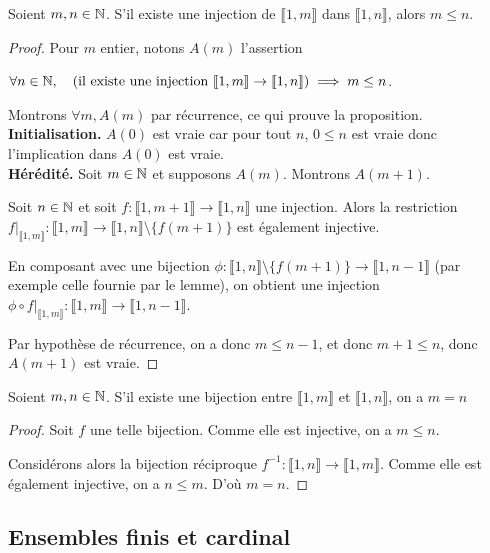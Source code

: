 \begin{lemme}
Soient $m,n\in \mathbb{N}$.
S'il existe une injection de $\llbracket 1,m\rrbracket$ dans $\llbracket 1,n\rrbracket$, alors $m\leq n$.
\end{lemme}
\begin{proof}
Pour $m$ entier, notons $A(m)$ l'assertion 
\begin{center}
$\forall n\in \mathbb{N}, \quad  (\text{il existe une injection } \llbracket 1,m\rrbracket \to \llbracket 1,n\rrbracket) \implies m\leq n$.
\end{center}
Montrons $\forall m, A(m)$ par récurrence, ce qui prouve la proposition.\\
\textbf{Initialisation.} $A(0)$ est vraie car pour tout $n$, $0\leq n$ est vraie donc l'implication dans $A(0)$ est vraie.\\
\textbf{Hérédité.} Soit $m\in\mathbb{N}$ et supposons $A(m)$. Montrons $A(m+1)$.

Soit $n\in \mathbb{N}$ et soit $f : \llbracket 1,m+1\rrbracket \to \llbracket 1,n\rrbracket$ une injection. Alors la restriction $f|_{\llbracket 1,m\rrbracket} : \llbracket 1,m\rrbracket \to \llbracket 1,n\rrbracket\setminus \{f(m+1)\}$ est également injective.

En composant avec une bijection $\phi : \llbracket 1,n\rrbracket\setminus \{f(m+1)\} \to \llbracket 1,n-1\rrbracket$ (par exemple celle fournie par le lemme), on obtient une injection $\phi\circ f|_{\llbracket 1,m\rrbracket} : \llbracket 1,m\rrbracket \to \llbracket 1,n-1\rrbracket$.

Par hypothèse de récurrence, on a donc $m\leq n-1$, et donc $m+1\leq n$, donc $A(m+1)$ est vraie.
\end{proof}

\begin{lemme}
Soient $m, n\in \mathbb{N}$. S'il existe une bijection entre $\llbracket 1,m\rrbracket$ et $\llbracket 1,n\rrbracket$, on a  $m=n$
\end{lemme}
\begin{proof}
Soit $f$ une telle bijection. Comme elle est injective, on a $m\leq n$.

Considérons alors la bijection réciproque $f^{-1} : \llbracket 1,n\rrbracket \to \llbracket 1,m\rrbracket$. Comme elle est également  injective, on a $n\leq m$. D'où $m=n$.
\end{proof}

\subsection{Ensembles finis et cardinal}

